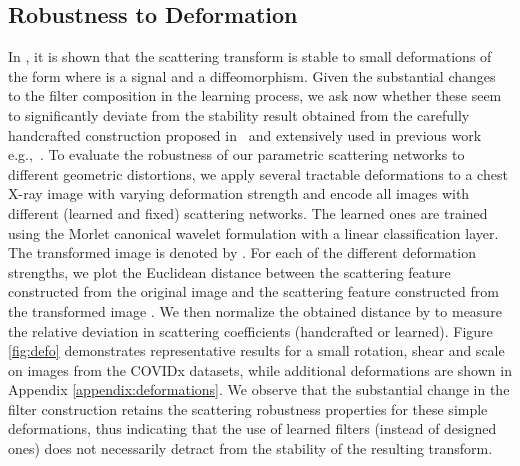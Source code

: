 \documentclass[10pt,twocolumn,letterpaper]{article}
\begin{document}
\subsection{Robustness to Deformation}
\label{section:deformation}
In \cite{mallat2012group}, it is shown that the scattering transform is stable to small deformations of the form  where  is a signal and  a diffeomorphism. Given the substantial changes to the filter composition in the learning process, we ask now whether these seem to significantly deviate from the stability result obtained from the carefully handcrafted construction proposed in~\cite{mallat2012group} and extensively used in previous work e.g.,~\cite{bruna2013invariant,eickenberg2018solid}. To evaluate the robustness of our parametric scattering networks to different geometric distortions, we apply several tractable deformations to a chest X-ray image  with varying deformation strength and encode all images with different (learned and fixed) scattering networks. The learned ones are trained using the Morlet canonical wavelet formulation with a linear classification layer. The transformed image is denoted by . For each of the different deformation strengths, we plot the Euclidean distance between the scattering feature constructed from the original image  and the scattering feature constructed from the transformed image . We then normalize the obtained distance by  to measure the relative deviation in scattering coefficients (handcrafted or learned). Figure \ref{fig:defo} demonstrates representative results for a small rotation, shear and scale on images from the COVIDx datasets, while additional deformations are shown in Appendix \ref{appendix:deformations}. We observe that the substantial change in the filter construction retains the scattering robustness properties for these simple deformations, thus indicating that the use of learned filters (instead of designed ones) does not necessarily detract from the stability of the resulting transform.
\end{document}
